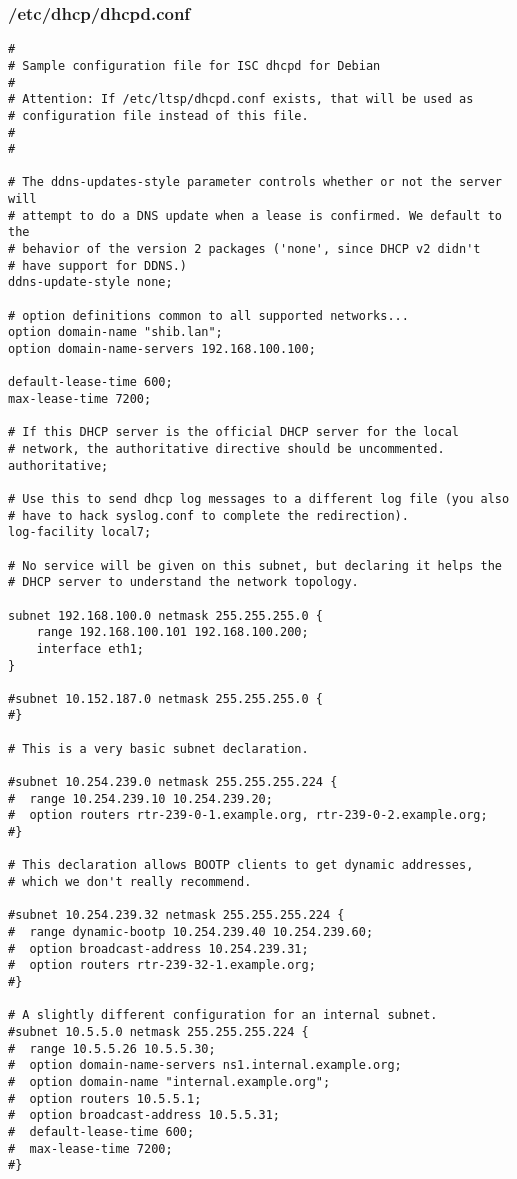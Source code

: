 \subsubsection{/etc/dhcp/dhcpd.conf}
\begin{lstlisting}
#
# Sample configuration file for ISC dhcpd for Debian
#
# Attention: If /etc/ltsp/dhcpd.conf exists, that will be used as
# configuration file instead of this file.
#
#

# The ddns-updates-style parameter controls whether or not the server will
# attempt to do a DNS update when a lease is confirmed. We default to the
# behavior of the version 2 packages ('none', since DHCP v2 didn't
# have support for DDNS.)
ddns-update-style none;

# option definitions common to all supported networks...
option domain-name "shib.lan";
option domain-name-servers 192.168.100.100;

default-lease-time 600;
max-lease-time 7200;

# If this DHCP server is the official DHCP server for the local
# network, the authoritative directive should be uncommented.
authoritative;

# Use this to send dhcp log messages to a different log file (you also
# have to hack syslog.conf to complete the redirection).
log-facility local7;

# No service will be given on this subnet, but declaring it helps the 
# DHCP server to understand the network topology.

subnet 192.168.100.0 netmask 255.255.255.0 {
	range 192.168.100.101 192.168.100.200;
	interface eth1;
}

#subnet 10.152.187.0 netmask 255.255.255.0 {
#}

# This is a very basic subnet declaration.

#subnet 10.254.239.0 netmask 255.255.255.224 {
#  range 10.254.239.10 10.254.239.20;
#  option routers rtr-239-0-1.example.org, rtr-239-0-2.example.org;
#}

# This declaration allows BOOTP clients to get dynamic addresses,
# which we don't really recommend.

#subnet 10.254.239.32 netmask 255.255.255.224 {
#  range dynamic-bootp 10.254.239.40 10.254.239.60;
#  option broadcast-address 10.254.239.31;
#  option routers rtr-239-32-1.example.org;
#}

# A slightly different configuration for an internal subnet.
#subnet 10.5.5.0 netmask 255.255.255.224 {
#  range 10.5.5.26 10.5.5.30;
#  option domain-name-servers ns1.internal.example.org;
#  option domain-name "internal.example.org";
#  option routers 10.5.5.1;
#  option broadcast-address 10.5.5.31;
#  default-lease-time 600;
#  max-lease-time 7200;
#}


\end{lstlisting}
